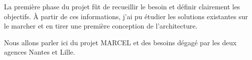 La première phase du projet fût de recueillir le besoin et définir clairement les objectifs. À partir de ces informations, j'ai pu étudier les solutions existantes sur le marcher et en tirer une première conception de l'architecture.

Nous allons parler ici du projet MARCEL et des besoins dégagé par les deux agences Nantes et Lille.